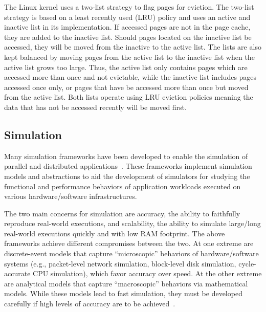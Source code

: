 \documentclass[conference]{IEEEtran}
\begin{document}
        The Linux kernel uses a two-list strategy to flag pages for eviction.
        The two-list strategy is based on a least recently used (LRU) policy
        and uses an active and inactive list in its implementation.
        If accessed pages are not in the page cache, they are added to the inactive list.
        Should pages located on the inactive list be accessed, they will be moved from
        the inactive to the active list.
        The lists are also kept balanced by moving pages from the active list
        to the inactive list when the active list grows too large.
        Thus, the active list only contains pages which are accessed more than once
        and not evictable, while the inactive list includes pages accessed once only,
        or pages that have be accessed more than once but moved from the active list.
        Both lists operate using LRU eviction policies meaning the data that has
        not be accessed recently will be moved first.

        \subsection{Simulation}

        Many simulation frameworks have been developed to enable the
        simulation of parallel and distributed
        applications~\cite{optorsim, gridsim, groudsim, cloudsim,
        nunez2012simcan,nunez2012icancloud, mdcsim, dissect_cf,
        cloudnetsimplusplus, fognetsimplusplus, casanova2014simgrid,
        ROSS, casanova2020fgcs}. These frameworks implement simulation
        models and abstractions to aid the development of simulators
        for studying the functional and performance behaviors of
        application workloads executed on various hardware/software
        infrastructures. 

        The two main concerns for simulation are accuracy,
        the ability to faithfully reproduce real-world executions, and
        scalability, the ability to simulate large/long real-world
        executions quickly and with low RAM footprint. The above
        frameworks achieve different compromises between the two.  At
        one extreme are discrete-event models that capture
        ``microscopic'' behaviors of hardware/software systems (e.g.,
        packet-level network simulation, block-level disk simulation,
        cycle-accurate CPU simulation), which favor accuracy over
        speed.  At the other extreme are analytical models that capture
        ``macroscopic'' behaviors via mathematical models.  While these
        models lead to fast simulation, they must be developed
        carefully if high levels of accuracy are to be
        achieved~\cite{velhoTOMACS2013}. 
\end{document}
